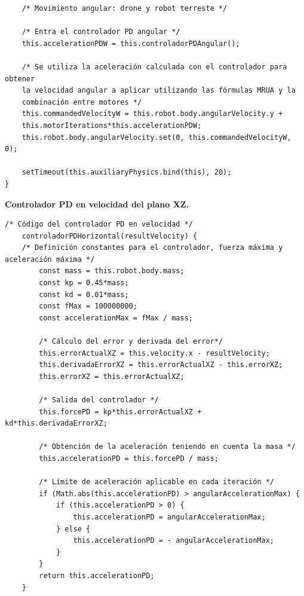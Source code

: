 {\begin{verbatim}
    /* Movimiento angular: drone y robot terreste */
    
    /* Entra el controlador PD angular */              
    this.accelerationPDW = this.controladorPDAngular();
    
    /* Se utiliza la aceleración calculada con el controlador para obtener 
    la velocidad angular a aplicar utilizando las fórmulas MRUA y la 
    combinación entre motores */
    this.commandedVelocityW = this.robot.body.angularVelocity.y + 
    this.motorIterations*this.accelerationPDW;
    this.robot.body.angularVelocity.set(0, this.commandedVelocityW, 0);
    
    setTimeout(this.auxiliaryPhysics.bind(this), 20);
}
\end{verbatim}
}
\normalsize
\textbf{Controlador PD en velocidad del plano XZ.}

\footnotesize {
\begin{verbatim}
/* Código del controlador PD en velocidad */
    controladorPDHorizontal(resultVelocity) {
    /* Definición constantes para el controlador, fuerza máxima y aceleración máxima */
        const mass = this.robot.body.mass;
        const kp = 0.45*mass;
        const kd = 0.01*mass;
        const fMax = 100000000;
        const accelerationMax = fMax / mass;

        /* Cálculo del error y derivada del error*/
        this.errorActualXZ = this.velocity.x - resultVelocity;
        this.derivadaErrorXZ = this.errorActualXZ - this.errorXZ;
        this.errorXZ = this.errorActualXZ;

        /* Salida del controlador */
        this.forcePD = kp*this.errorActualXZ + kd*this.derivadaErrorXZ;
        
        /* Obtención de la aceleración teniendo en cuenta la masa */
        this.accelerationPD = this.forcePD / mass;

        /* Límite de aceleración aplicable en cada iteración */
        if (Math.abs(this.accelerationPD) > angularAccelerationMax) {
            if (this.accelerationPD > 0) {
                this.accelerationPD = angularAccelerationMax;
            } else {
                this.accelerationPD = - angularAccelerationMax;
            }
        }
        return this.accelerationPD;
    }
\end{verbatim}
}


